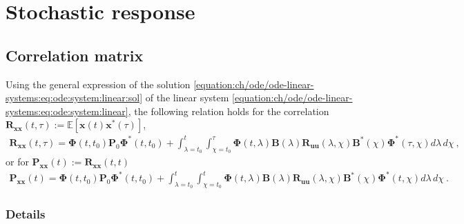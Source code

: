 \documentclass[letterpaper,10pt,english]{jupyterBook}
\begin{document}
\section{Stochastic response}
\label{\detokenize{ch/ode/ode-linear-systems:stochastic-response}}\label{\detokenize{ch/ode/ode-linear-systems:ode-linear-miscellanea-stochastic-response}}

\subsection{Correlation matrix}
\label{\detokenize{ch/ode/ode-linear-systems:correlation-matrix}}\label{\detokenize{ch/ode/ode-linear-systems:ode-linear-miscellanea-stochastic-response-correlation-matrix}}
\sphinxAtStartPar
Using the general expression of the solution \eqref{equation:ch/ode/ode-linear-systems:eq:ode:system:linear:sol} of the linear system \eqref{equation:ch/ode/ode-linear-systems:eq:ode:system:linear}, the following relation holds for the correlation \(\mathbf{R}_{\mathbf{x}\mathbf{x}}(t,\tau) := \mathbb{E}[ \mathbf{x}(t) \mathbf{x}^*(\tau) ]\),
\begin{equation*}
\begin{split}\mathbf{R}_{\mathbf{x}\mathbf{x}}(t, \tau) = \boldsymbol\Phi(t,t_0) \mathbf{P}_0 \boldsymbol\Phi^*(t,t_0) + \int_{\lambda=t_0}^{t} \int_{\chi=t_0}^{\tau}  \boldsymbol\Phi(t,\lambda) \mathbf{B}(\lambda) \mathbf{R}_{\mathbf{u}\mathbf{u}}(\lambda, \chi) \mathbf{B}^*(\chi) \boldsymbol\Phi^*(\tau,\chi)  d \lambda \, d \chi \ ,\end{split}
\end{equation*}
\sphinxAtStartPar
or for \(\mathbf{P}_{\mathbf{x}\mathbf{x}}(t) := \mathbf{R}_{\mathbf{x} \mathbf{x}}(t,t)\)
\begin{equation*}
\begin{split}\mathbf{P}_{\mathbf{x}\mathbf{x}}(t) = \boldsymbol\Phi(t,t_0) \mathbf{P}_0 \boldsymbol\Phi^*(t,t_0) + \int_{\lambda=t_0}^{t} \int_{\chi=t_0}^{t}  \boldsymbol\Phi(t,\lambda) \mathbf{B}(\lambda) \mathbf{R}_{\mathbf{u}\mathbf{u}}(\lambda, \chi) \mathbf{B}^*(\chi) \boldsymbol\Phi^*(t,\chi)  d \lambda \, d \chi \ .\end{split}
\end{equation*}\subsubsection*{Details}
\end{document}
